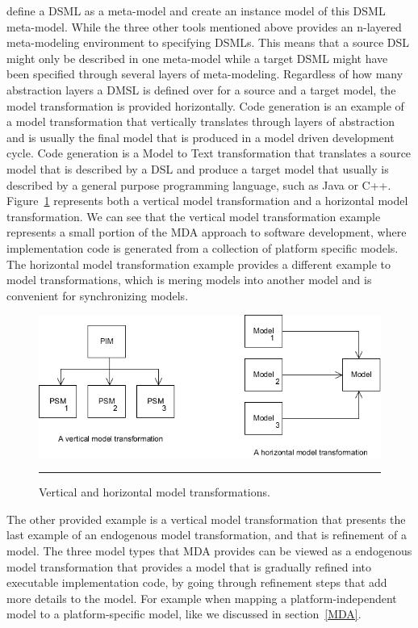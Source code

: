 define a DSML as a meta-model and create an instance model of this DSML
meta-model. While the three other tools mentioned above provides an n-layered
meta-modeling environment to specifying DSMLs. This means that a source DSL
might only be described in one meta-model while a target DSML might have been
specified through several layers of meta-modeling. Regardless of how many
abstraction layers a DMSL is defined over for a source and a target model, the
model transformation is provided horizontally. Code generation is an example of
a model transformation that vertically translates through layers of abstraction
and is usually the final model that is produced in a model driven development
cycle. Code generation is a Model to Text transformation that translates a
source model that is described by a DSL and produce a target model that usually
is described by a general purpose programming language, such as Java or C++.
Figure~\ref{fig:vertical_horizontal} represents both a vertical model
transformation and a horizontal model transformation. We can see that the
vertical model transformation example represents a small portion of the MDA
approach to software development, where implementation code is generated from a
collection of platform specific models. The horizontal model transformation
example provides a different example to model transformations, which is mering
models into another model and is convenient for synchronizing models.

\begin{figure}[H]
  \centering
    \includegraphics[scale=0.8]{./Figures/vertical_horizontal.png}
    \rule{35em}{0.5pt}
  \caption[Vertical and Horizontal model transformations]
  {Vertical and horizontal model transformations.}
  \label{fig:vertical_horizontal}
\end{figure}

The other provided example is a vertical model transformation that presents the
last example of an endogenous model transformation, and that is refinement of a
model. The three model types that MDA provides
can be viewed as a endogenous model transformation that provides a model that
is gradually refined into executable implementation code, by going through
refinement steps that add more details to the model. For example when mapping a
platform-independent model to a platform-specific model, like we discussed in
section~\ref{MDA}. 

